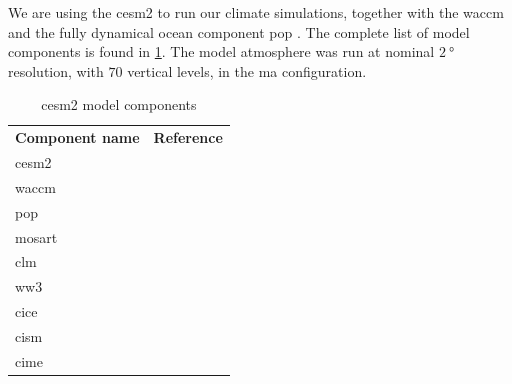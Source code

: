 \documentclass[twocol]{ametsocV5}
\begin{document}
We are using the \acrfull{cesm2} \citep{danabasoglu2020} to run our climate simulations,
together with the \acrfull{waccm} \citep{gettleman2019} and the fully dynamical ocean
component \acrfull{pop} \citep{smith2010, danabasoglu2020}. The complete list of model
components is found in \cref{tab:cesm-components}. The model atmosphere was run at
nominal \(\SI{2}{\degree}\) resolution, with \(70\) vertical levels, in the \acrfull{ma}
configuration.

\begin{table}
  \caption{\acrshort{cesm2} model components}%
  \label{tab:cesm-components}
  \begin{center}
    \begin{tabular}[c]{ll}
      \multicolumn{1}{c}{\textbf{Component name}} &
      \multicolumn{1}{c}{\textbf{Reference}}                                              \\
      \acrlong{cesm2}                             & \citet{danabasoglu2020}               \\
      \acrlong{waccm}                             & \citet{gettleman2019}                 \\
      \acrlong{pop}                               & \citet{smith2010, danabasoglu2020}    \\
      \acrlong{mosart}                            & \citet{li2013, danabasoglu2020}       \\
      \acrlong{clm}                               & \citet{lawrence2019, danabasoglu2020} \\
      \acrlong{ww3}                               & \citet{danabasoglu2020}               \\
      \acrlong{cice}                              & \citet{danabasoglu2020}               \\
      \acrlong{cism}                              & \citet{danabasoglu2020}               \\
      \acrlong{cime}                              & \citet{danabasoglu2020}
    \end{tabular}
  \end{center}
\end{table}
\end{document}
